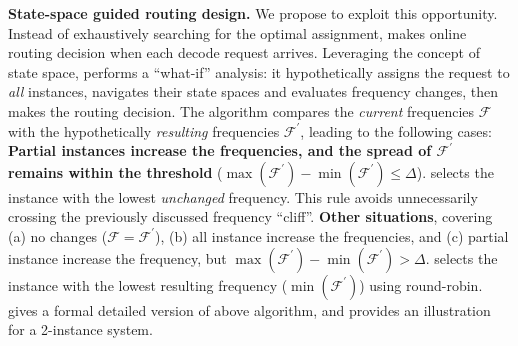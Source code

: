 \noindent
\textbf{State-space guided routing design.}
We propose \router to exploit this opportunity.
Instead of exhaustively searching for the optimal assignment, \router makes online routing decision when each decode request arrives.
Leveraging the concept of state space, \router performs a ``what-if'' analysis: it hypothetically assigns the request to \emph{all} instances, navigates their state spaces and evaluates frequency changes, then makes the routing decision.
The algorithm compares the \emph{current} frequencies $\mathcal{F}$ with the hypothetically \emph{resulting} frequencies $\mathcal{F}^\prime$, leading to the following cases:
 \textbf{Partial instances increase the frequencies, and the spread of $\mathcal{F}^\prime$ remains within the threshold} ($\max(\mathcal{F}^\prime)-\min(\mathcal{F}^\prime) \le \Delta$).
\router selects the instance with the lowest \emph{unchanged} frequency.
This rule avoids unnecessarily crossing the previously discussed frequency ``cliff''.
 \textbf{Other situations}, covering (a) no changes ($\mathcal{F}=\mathcal{F}^\prime$), (b) all instance increase the frequencies, and (c) partial instance increase the frequency, but $\max(\mathcal{F}^\prime)-\min(\mathcal{F}^\prime) > \Delta$.
\router selects the instance with the lowest resulting frequency ($\min(\mathcal{F}^\prime)$) using round-robin.
 gives a formal detailed version of above algorithm, and  provides an illustration for a 2-instance system.




